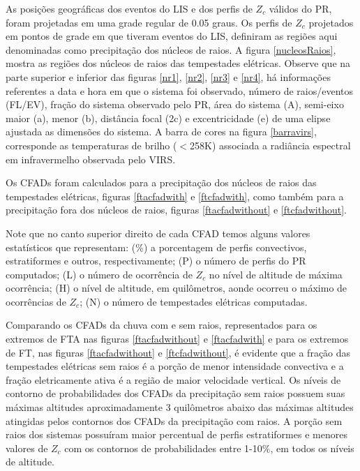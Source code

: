 As posições geográficas dos eventos do LIS e dos perfis de $Z_c$ válidos do PR, foram projetadas em uma grade regular de 0.05 graus. Os perfis de $Z_c$ projetados em pontos de grade em que tiveram eventos do LIS, definiram as regiões aqui denominadas como precipitação dos núcleos de raios. A figura \ref{nucleosRaios}, mostra as regiões dos núcleos de raios das tempestades elétricas. Observe que na parte superior e inferior das figuras \ref{nr1}, \ref{nr2}, \ref{nr3} e \ref{nr4}, há informações referentes a data e hora em que o sistema foi observado, número de raios/eventos (FL/EV), fração do sistema observado pelo PR, área do sistema (A), semi-eixo maior (a), menor (b), distância focal (2c) e excentricidade (e) de uma elipse ajustada as dimensões do sistema. A barra de cores na figura \ref{barravirs}, corresponde as temperaturas de brilho ($<$258K) associada a radiância espectral em infravermelho observada pelo VIRS.


Os CFADs foram calculados para a precipitação dos núcleos de raios das tempestades elétricas, figuras \ref{ftacfadwith} e \ref{ftcfadwith}, como também para a precipitação fora dos núcleos de raios, figuras \ref{ftacfadwithout} e \ref{ftcfadwithout}.

Note que no canto superior direito de cada CFAD temos alguns valores estatísticos que representam: (\%)  a porcentagem de perfis convectivos, estratiformes e outros, respectivamente; (P) o número de perfis do PR computados; (L) o número de ocorrência de $Z_c$ no nível de altitude de máxima ocorrência; (H) o nível de altitude, em quilômetros, aonde ocorreu o máximo de ocorrências de $Z_c$; (N) o número de tempestades elétricas computadas.


Comparando os CFADs da chuva com e sem raios, representados para os extremos de FTA nas figuras \ref{ftacfadwithout} e \ref{ftacfadwith} e para os extremos de FT, nas figuras \ref{ftacfadwithout} e \ref{ftcfadwithout}, é evidente que a fração das tempestades elétricas sem raios é a porção de menor intensidade convectiva e a fração eletricamente ativa é a região de maior velocidade vertical. Os níveis de contorno de probabilidades dos CFADs da precipitação sem raios possuem suas máximas altitudes aproximadamente 3 quilômetros abaixo das máximas altitudes atingidas pelos contornos dos CFADs da precipitação com raios. A porção sem raios dos sistemas possuíram maior percentual de perfis estratiformes e menores valores de $Z_c$ com os contornos de probabilidades entre 1-10\%, em todos os níveis de altitude.

